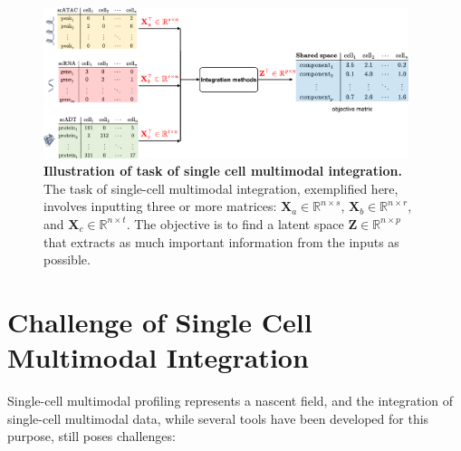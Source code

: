 \begin{figure}[!h]
    \centering
    \includegraphics[width=0.95\textwidth]{integration_scheme/fig}
    \vspace{0.1cm}
    \caption[Illustration of task of single cell multimodal integration.]{\textbf{Illustration of task of single cell multimodal integration.} The task of single-cell multimodal integration, exemplified here, involves inputting three or more matrices: $\mathbf{X}_a \in \mathbb{R}^{n \times s}$, $\mathbf{X}_b \in \mathbb{R}^{n \times r}$, and $\mathbf{X}_c \in \mathbb{R}^{n \times t}$. The objective is to find a latent space $\mathbf{Z} \in \mathbb{R}^{n \times p}$ that extracts as much important information from the inputs as possible. }
    \label{fig:integration_scheme}
 \end{figure}


\section{Challenge of Single Cell Multimodal Integration}
\label{bgInte:challenge_integration}
Single-cell multimodal profiling represents a nascent field, and the integration of single-cell multimodal data, while several tools have been developed for this purpose, still poses challenges:

